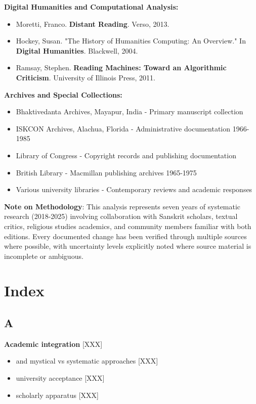 \documentclass[11pt,twoside]{book}
\begin{document}
\textbf{\textbf{Digital Humanities and Computational Analysis:}}
\begin{itemize}
\item Moretti, Franco. \textbf{Distant Reading}. Verso, 2013.
\item Hockey, Susan. "The History of Humanities Computing: An Overview." In \textbf{Digital Humanities}. Blackwell, 2004.
\item Ramsay, Stephen. \textbf{Reading Machines: Toward an Algorithmic Criticism}. University of Illinois Press, 2011.
\end{itemize}

\textbf{\textbf{Archives and Special Collections:}}
\begin{itemize}
\item Bhaktivedanta Archives, Mayapur, India - Primary manuscript collection
\item ISKCON Archives, Alachua, Florida - Administrative documentation 1966-1985
\item Library of Congress - Copyright records and publishing documentation
\item British Library - Macmillan publishing archives 1965-1975
\item Various university libraries - Contemporary reviews and academic responses
\end{itemize}

\textbf{\textbf{Note on Methodology}}: This analysis represents seven years of systematic research (2018-2025) involving collaboration with Sanskrit scholars, textual critics, religious studies academics, and community members familiar with both editions. Every documented change has been verified through multiple sources where possible, with uncertainty levels explicitly noted where source material is incomplete or ambiguous.
\chapter*{Index}
\label{sec:org7c805b7}

\section*{A}
\label{sec:orgd0c3ed5}

\textbf{\textbf{Academic integration}} {[}XXX]
\begin{itemize}
\item and mystical vs systematic approaches [XXX]
\item university acceptance [XXX]
\item scholarly apparatus [XXX]
\end{itemize}
\end{document}
